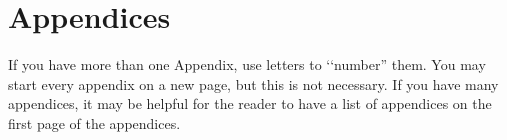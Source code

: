 \section{Appendices}\label{ap:appendices}
If you have more than one Appendix, use letters to ‘‘number” them. You may start every appendix on a new page, but this is not necessary. If you have many appendices, it may be helpful for the reader to have a list of appendices on the first page of the appendices.